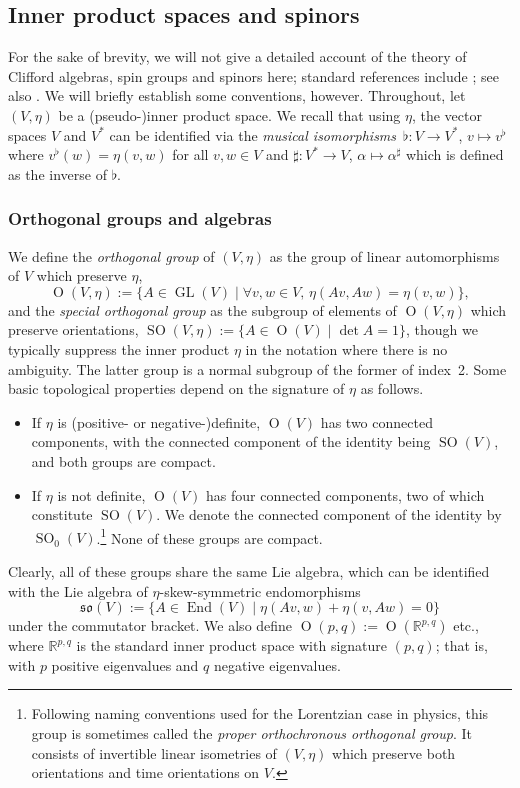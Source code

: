 \documentclass[10pt,a4paper]{amsart}
\numberwithin{equation}{section}
\newcommand{\fso}{\mathfrak{so}}
\newcommand{\RR}{\mathbb{R}}
\newcommand{\1}{\mathbbm{1}}
\DeclareMathOperator{\End}{End}
\DeclareMathOperator{\GL}{GL}
\DeclareMathOperator{\Orth}{O}
\DeclareMathOperator{\SO}{SO}
\begin{document}
\subsection{Inner product spaces and spinors}
\label{sec:inner-products-spinors}

For the sake of brevity, we will not give a detailed account of the theory of Clifford algebras, spin groups and spinors here; standard references include \cite{Harvey1990,Lawson1989}; see also \cite{JMF-spin}. We will briefly establish some conventions, however. Throughout, let $(V,\eta)$ be a (pseudo-)inner product space.
We recall that using $\eta$, the vector spaces $V$ and $V^*$ can be identified via the \emph{musical isomorphisms}~${\flat\colon V\to V^*}$, $v\mapsto v^\flat$ where
$v^\flat(w) = \eta(v,w)
$
for all $v,w\in V$ and $\sharp\colon V^*\to V$, $\alpha\mapsto\alpha^\sharp$ which is defined as the inverse of $\flat$.

\subsubsection{Orthogonal groups and algebras}
\label{sec:orth-groups-algs}

We define the \emph{orthogonal group} of $(V,\eta)$ as the group of linear automorphisms of $V$ which preserve $\eta$,
\[
	\Orth(V,\eta) := \{A\in\GL(V) \mid \forall v,w\in V,\, \eta(Av,Aw) = \eta(v,w)\},
\]
and the \emph{special orthogonal group} as the subgroup of elements of $\Orth(V,\eta)$ which preserve orientations,
$\SO(V,\eta) := \{A\in \Orth(V) \mid \det A = 1\}$,
though we typically suppress the inner product $\eta$ in the notation where there is no ambiguity. The latter group is a normal subgroup of the former of index~2. Some basic topological properties depend on the signature of $\eta$ as follows.
\begin{itemize}\itemsep=0pt
	\item If $\eta$ is (positive- or negative-)definite, $\Orth(V)$ has two connected components, with the connected component of the identity being $\SO(V)$, and both groups are compact.
	\item If $\eta$ is not definite, $\Orth(V)$ has four connected components, two of which constitute $\SO(V)$. We denote the connected component of the identity by $\SO_0(V)$.\footnote{Following naming conventions used for the Lorentzian case in physics, this group is sometimes called the \emph{proper orthochronous orthogonal group}. It consists of invertible linear isometries of $(V,\eta)$ which preserve both orientations and time orientations on $V$.} None of these groups are compact.
\end{itemize}
Clearly, all of these groups share the same Lie algebra, which can be identified with the Lie algebra of $\eta$-skew-symmetric endomorphisms
\[
	\fso(V) := \{A\in\End(V) \mid \eta(Av,w) + \eta(v,Aw) = 0\}
\]
under the commutator bracket. We also define $\Orth(p,q):=\Orth(\RR^{p,q})$ etc., where $\RR^{p,q}$ is the standard inner product space with signature $(p,q)$; that is, with $p$ positive eigenvalues and $q$ negative eigenvalues.
\end{document}
